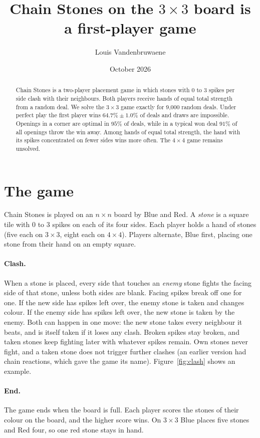 \documentclass[11pt,a4paper]{article}
\title{Chain Stones on the $3\times3$ board is a first-player game}
\author{Louis Vandenbruwaene}
\date{October 2026}
\begin{document}
\maketitle

\begin{abstract}
\noindent
Chain Stones is a two-player placement game in which stones with 0 to 3 spikes per side clash with their neighbours. Both players receive hands of equal total strength from a random deal. We solve the $3\times3$ game exactly for 9{,}000 random deals. Under perfect play the first player wins $64.7\% \pm 1.0\%$ of deals and draws are impossible. Openings in a corner are optimal in $95\%$ of deals, while in a typical won deal $91\%$ of all openings throw the win away. Among hands of equal total strength, the hand with its spikes concentrated on fewer sides wins more often. The $4\times4$ game remains unsolved.
\end{abstract}

\section{The game}

Chain Stones is played on an $n\times n$ board by Blue and Red. A \emph{stone} is a square tile with $0$ to $3$ spikes on each of its four sides. Each player holds a hand of stones (five each on $3\times3$, eight each on $4\times4$). Players alternate, Blue first, placing one stone from their hand on an empty square.

\paragraph{Clash.} When a stone is placed, every side that touches an \emph{enemy} stone fights the facing side of that stone, unless both sides are blank. Facing spikes break off one for one. If the new side has spikes left over, the enemy stone is taken and changes colour. If the enemy side has spikes left over, the new stone is taken by the enemy. Both can happen in one move: the new stone takes every neighbour it beats, and is itself taken if it loses any clash. Broken spikes stay broken, and taken stones keep fighting later with whatever spikes remain. Own stones never fight, and a taken stone does not trigger further clashes (an earlier version had chain reactions, which gave the game its name). Figure~\ref{fig:clash} shows an example.

\paragraph{End.} The game ends when the board is full. Each player scores the stones of their colour on the board, and the higher score wins. On $3\times3$ Blue places five stones and Red four, so one red stone stays in hand.
\end{document}
